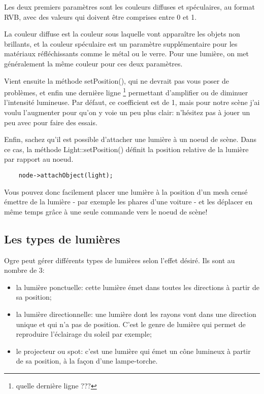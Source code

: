 Les deux premiers paramètres sont les couleurs diffuses et spéculaires, au format RVB, avec des valeurs qui doivent être comprises entre 0 et 1.

La couleur diffuse est la couleur sous laquelle vont apparaître les objets non brillants, et la couleur spéculaire est un paramètre supplémentaire pour les matériaux réfléchissants comme le métal ou le verre. Pour une lumière, on met généralement la même couleur pour ces deux paramètres.

Vient ensuite la méthode setPosition(), qui ne devrait pas vous poser de problèmes, et enfin une dernière ligne \footnote{quelle dernière ligne ???} permettant d'amplifier ou de diminuer l'intensité lumineuse. Par défaut, ce coefficient est de 1, mais pour notre scène j'ai voulu l'augmenter pour qu'on y voie un peu plus clair: n'hésitez pas à jouer un peu avec pour faire des essais.

Enfin, sachez qu'il est possible d'attacher une lumière à un noeud de scène. Dans ce cas, la méthode Light::setPosition() définit la position relative de la lumière par rapport au noeud.
\begin{lstlisting}
	node->attachObject(light);
\end{lstlisting}


Vous pouvez donc facilement placer une lumière à la position d'un mesh censé émettre de la lumière - par exemple les phares d'une voiture - et les déplacer en même temps grâce à une seule commande vers le noeud de scène!





\subsection{Les types de lumières}

Ogre peut gérer différents types de lumières selon l'effet désiré. Ils sont au nombre de 3:

\begin{itemize}
\item la lumière ponctuelle: cette lumière émet dans toutes les directions à partir de sa position;
\item la lumière directionnelle: une lumière dont les rayons vont dans une direction unique et qui n'a pas de position. C'est le genre de lumière qui permet de reproduire l'éclairage du soleil par exemple;
\item le projecteur ou spot: c'est une lumière qui émet un cône lumineux à partir de sa position, à la façon d'une lampe-torche.
\end{itemize}
    




